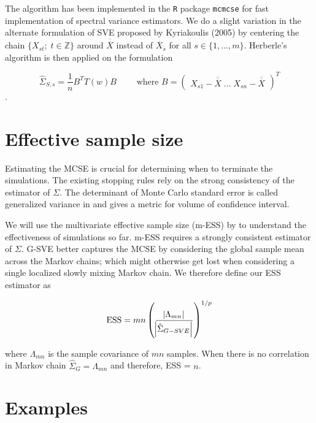 \documentclass[11pt]{article}
\theoremstyle{remark}
\begin{document}
The algorithm has been implemented in the \texttt{R} package \texttt{mcmcse} for fast implementation of spectral variance estimators. We do a slight variation in the alternate formulation of SVE proposed by Kyriakoulis (2005) by centering the chain $\{X_{st}; \; t \in \mathbb{Z}\}$ around $\overline{\overline{X}}$ instead of $\overline{X}_s$ for all $s \in \{1, ..., m\}$. Herberle's algorithm is then applied on the formulation

\[
\hat{\Sigma}_{S,s} = \dfrac{1}{n}B^T T(w) B \qquad \textrm{ where } B = 
\begin{pmatrix}
    X_{s1} - \overline{\overline{X}} \; \dots \; X_{sn} - \overline{\overline{X}}
\end{pmatrix}^T
\].


\section{Effective sample size} \label{sec:ess}

Estimating the MCSE is crucial for determining when to terminate the simulations. The existing stopping rules rely on the strong consistency of the estimator of $\Sigma$. The determinant of Monte Carlo standard error is called generalized variance in  \cite{wilks1932certain} and gives a metric for volume of confidence interval. 

We will use the multivariate effective sample size (m-ESS) by \cite{vats2019multivariate} to understand the effectiveness of simulations so far. m-ESS requires a strongly consistent estimator of $\Sigma$. G-SVE better captures the MCSE by considering the global sample mean across the Markov chains; which might otherwise get lost when considering a single localized slowly mixing Markov chain. We therefore define our ESS estimator as

\[
\text{ESS} = mn\left(\dfrac{\abs{\Lambda_{mn}}}{\abs{\hat{\Sigma}_{G-SVE}}}\right)^{1/p}
\]

where $\Lambda_{mn}$ is the sample covariance of $mn$ samples. When there is no correlation in Markov chain $\hat{\Sigma}_{G} = \Lambda_{mn}$ and therefore, ESS = $n$. 

\section{Examples} \label{sec:examples}
\end{document}
